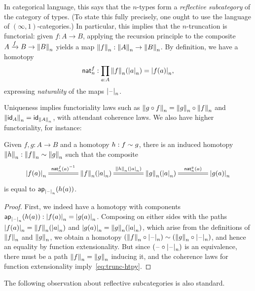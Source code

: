 In categorical language, this says that the $n$-types form a \emph{reflective subcategory} of the category of types.
%
(To state this fully precisely, one ought to use the language of $(\infty,1)$-categories.)
%
In particular, this implies that the $n$-truncation is functorial:
given $f:A\to B$, applying the recursion principle to the composite $A\xrightarrow{f} B \to \trunc n B$ yields a map $\trunc n f: \trunc n A \to \trunc n B$.
By definition, we have a homotopy
\begin{equation}
  \mathsf{nat}^f_n : \prd{a:A} \trunc n f(\tproj n a) = \tproj n {f(a)},\label{eq:trunc-nat}
\end{equation}
expressing \emph{naturality} of the maps $\tprojf n$.

Uniqueness implies functoriality laws such as $\trunc n {g\circ f} = \trunc n g \circ \trunc n f$ and $\trunc n{\idfunc[A]} = \idfunc[\trunc n A]$, with attendant coherence laws.
We also have higher functoriality, for instance:

\begin{lem}\label{thm:trunc-htpy}
  Given $f,g:A\to B$ and a homotopy $h:f\htpy g$, there is an induced homotopy $\trunc n h : \trunc n f \htpy \trunc n g$ such that the composite
  \begin{equation}
    \xymatrix@C=3.6pc{\tproj n{f(a)} \ar@{=}[r]^-{\opp{\mathsf{nat}^f_n(a)}} &
      \trunc n f(\tproj n a) \ar@{=}[r]^-{\trunc n h(\tproj na)} &
      \trunc n g(\tproj n a) \ar@{=}[r]^-{\mathsf{nat}^g_n(a)} &
      \tproj n{g(a)}}\label{eq:trunc-htpy}
  \end{equation}
  is equal to $\apfunc{\tprojf n}(h(a))$.
\end{lem}
\begin{proof}
  First, we indeed have a homotopy with components $\apfunc{\tprojf n}(h(a)) : \tproj n{f(a)} = \tproj n{g(a)}$.
  Composing on either sides with the paths $\tproj n{f(a)} = \trunc n f(\tproj n a)$ and $\tproj n{g(a)} = \trunc n g(\tproj n a)$, which arise from the definitions of $\trunc n f$ and $\trunc ng$, we obtain a homotopy $(\trunc n f \circ \tprojf n) \htpy (\trunc n g \circ \tprojf n)$, and hence an equality by function extensionality.
  But since $(\blank\circ \tprojf n)$ is an equivalence, there must be a path $\trunc nf = \trunc ng$ inducing it, and the coherence laws for function extensionality imply~\eqref{eq:trunc-htpy}.
\end{proof}

The following observation about reflective subcategories is also standard.

